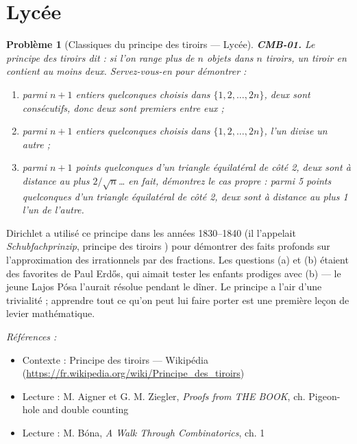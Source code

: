 \documentclass[11pt]{article}
\newtheorem{problem}{Problème}
\newenvironment{refs}{\par\small\noindent\emph{Références :}\begin{itemize}\setlength\itemsep{0pt}}{\end{itemize}\normalsize}
\begin{document}
\bigskip


\section*{Lycée}

\begin{problem}[{Classiques du principe des tiroirs --- Lycée}]
\textbf{CMB-01.} Le principe des tiroirs dit : si l'on range plus de $ n $ objets dans
$ n $ tiroirs, un tiroir en contient au moins deux. Servez-vous-en pour démontrer :
\begin{enumerate}
\item[(a)] parmi $ n+1 $ entiers quelconques choisis dans $ \{1, 2, \dots, 2n\} $, deux sont
consécutifs, donc deux sont premiers entre eux ;
\item[(b)] parmi $ n+1 $ entiers quelconques choisis dans $ \{1, 2, \dots, 2n\} $, l'un divise un
autre ;
\item[(c)] parmi $ n+1 $ points quelconques d'un triangle équilatéral de côté 2, deux sont à distance
au plus $ 2/\sqrt{n} $\dots{} en fait, démontrez le cas propre : parmi 5 points quelconques d'un
triangle équilatéral de côté 2, deux sont à distance au plus 1 l'un de l'autre.
\end{enumerate}

\end{problem}

\noindent Dirichlet a utilisé ce principe dans les années 1830--1840 (il l'appelait
\textit{Schubfachprinzip}, \og{} principe des tiroirs \fg{}) pour démontrer des faits profonds sur
l'approximation des irrationnels par des fractions. Les questions (a) et (b) étaient des
favorites de Paul Erd\H{o}s, qui aimait tester les enfants prodiges avec (b) --- le jeune Lajos Pósa
l'aurait résolue pendant le dîner. Le principe a l'air d'une trivialité ; apprendre tout ce qu'on
peut lui faire porter est une première leçon de levier mathématique.

\begin{refs}
\item Contexte : Principe des tiroirs --- Wikipédia (\url{https://fr.wikipedia.org/wiki/Principe_des_tiroirs})
\item Lecture : M. Aigner et G. M. Ziegler, \textit{Proofs from THE BOOK}, ch. \og{} Pigeon-hole and double counting \fg{}
\item Lecture : M. Bóna, \textit{A Walk Through Combinatorics}, ch. 1
\end{refs}

\bigskip
\end{document}
